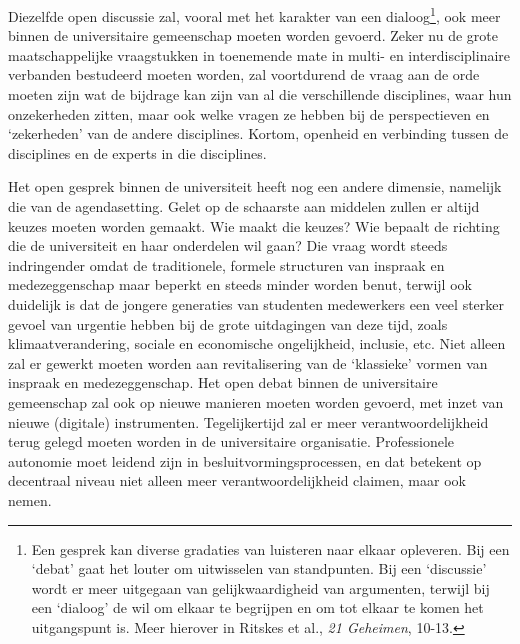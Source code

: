 \documentclass[smallauthor, chapterhaspagenum, nochapterinheader, pagenuminheader,  bigchapnum,medium2, tocpages, garamond, titleinheader]{jote-book}
\begin{document}
	Diezelfde open discussie zal, vooral met het karakter van een dialoog\footnote{Een gesprek kan diverse gradaties van luisteren naar elkaar opleveren. Bij een ‘debat' gaat het louter om uitwisselen van standpunten. Bij een ‘discussie' wordt er meer uitgegaan van gelijkwaardigheid van argumenten, terwijl bij een ‘dialoog' de wil om elkaar te begrijpen en om tot elkaar te komen het uitgangspunt is. Meer hierover in Ritskes et al., \emph{21 Geheimen}, 10-13.}, ook meer binnen de universitaire gemeenschap moeten worden gevoerd. Zeker nu de grote maatschappelijke vraagstukken in toenemende mate in multi- en interdisciplinaire verbanden bestudeerd moeten worden, zal voortdurend de vraag aan de orde moeten zijn wat de bijdrage kan zijn van al die verschillende disciplines, waar hun onzekerheden zitten, maar ook welke vragen ze hebben bij de perspectieven en ‘zekerheden' van de andere disciplines. Kortom, openheid en verbinding tussen de disciplines en de experts in die disciplines.



	Het open gesprek binnen de universiteit heeft nog een andere dimensie, namelijk die van de agendasetting. Gelet op de schaarste aan middelen zullen er altijd keuzes moeten worden gemaakt. Wie maakt die keuzes? Wie bepaalt de richting die de universiteit en haar onderdelen wil gaan? Die vraag wordt steeds indringender omdat de traditionele, formele structuren van inspraak en medezeggenschap maar beperkt en steeds minder worden benut, terwijl ook duidelijk is dat de jongere generaties van studenten medewerkers een veel sterker gevoel van urgentie hebben bij de grote uitdagingen van deze tijd, zoals klimaatverandering, sociale en economische ongelijkheid, inclusie, etc. Niet alleen zal er gewerkt moeten worden aan revitalisering van de ‘klassieke' vormen van inspraak en medezeggenschap. Het open debat binnen de universitaire gemeenschap zal ook op nieuwe manieren moeten worden gevoerd, met inzet van nieuwe (digitale) instrumenten. Tegelijkertijd zal er meer verantwoordelijkheid terug gelegd moeten worden in de universitaire organisatie. Professionele autonomie moet leidend zijn in besluitvormingsprocessen, en dat betekent op decentraal niveau niet alleen meer verantwoordelijkheid claimen, maar ook nemen.
\end{document}
